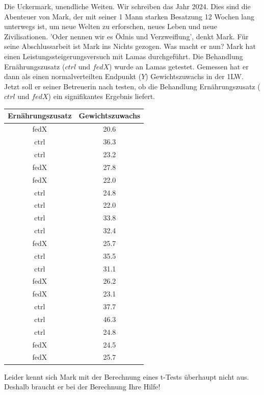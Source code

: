 \documentclass[a4paper, 9pt]{scrartcl}\usepackage[]{graphicx}\usepackage[]{xcolor}
\begin{document}
Die Uckermark, unendliche Weiten. Wir schreiben das Jahr 2024. Dies sind die Abenteuer von Mark, der mit seiner 1 Mann starken Besatzung 12 Wochen lang unterwegs ist, um neue Welten zu erforschen, neues Leben und neue Zivilisationen. 'Oder nennen wir es Ödnis und Verzweiflung', denkt Mark. Für seine Abschlussarbeit ist Mark ins Nichts gezogen. Was macht er nun? Mark hat einen Leistungssteigerungsversuch mit Lamas durchgeführt. Die Behandlung Ernährungszusatz ($ctrl$ und $fedX$) wurde an Lamas getestet. Gemessen hat er dann als einen normalverteilten Endpunkt ($Y$) Gewichtszuwachs in der 1LW. Jetzt soll er seiner Betreuerin nach testen, ob die Behandlung Ernährungszusatz ($ctrl$ und $fedX$) ein signifikantes Ergebnis liefert.

\begin{table}[!h]
\centering
\begin{tabular}{cc}
\toprule
Ernährungszusatz & Gewichtszuwachs\\
\midrule
fedX & 20.6\\
ctrl & 36.3\\
ctrl & 23.2\\
fedX & 27.8\\
fedX & 22.0\\
\addlinespace
ctrl & 24.8\\
ctrl & 22.0\\
ctrl & 33.8\\
ctrl & 32.4\\
fedX & 25.7\\
\addlinespace
ctrl & 35.5\\
ctrl & 31.1\\
fedX & 26.2\\
fedX & 23.1\\
ctrl & 37.7\\
\addlinespace
ctrl & 46.3\\
ctrl & 24.8\\
fedX & 24.5\\
fedX & 25.7\\
\bottomrule
\end{tabular}
\end{table}



Leider kennt sich Mark mit der Berechnung eines t-Tests überhaupt nicht aus. Deshalb braucht er bei der Berechnung Ihre Hilfe!
\end{document}
